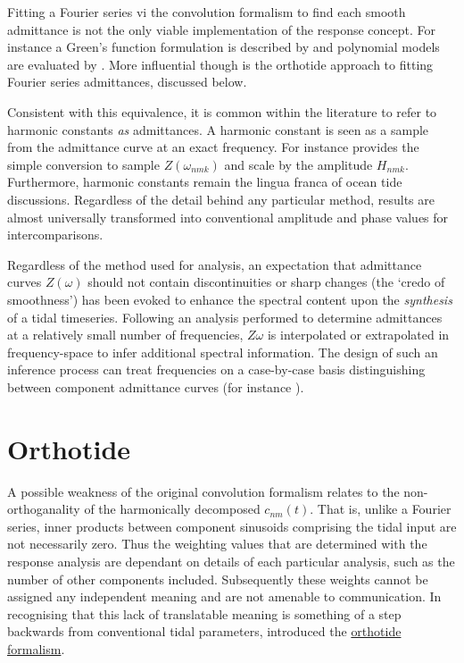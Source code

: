 Fitting a Fourier series vi the convolution formalism to find each smooth admittance is not the only viable implementation of the response concept.  For instance a Green's function formulation is described by \citet{Webb:1974ke} and polynomial models are evaluated by \citet{Desai:1995je}. More influential though is the orthotide approach to fitting Fourier series admittances, discussed below.


Consistent with this equivalence, it is common within the literature to refer to harmonic constants \emph{as} admittances.   A harmonic constant is seen as a sample from the admittance curve at an exact frequency. For instance \citet{Smith:1997ut} provides the simple conversion to sample $Z(\omega_{nmk})$ and scale by the \ATGP{} amplitude $H_{nmk}$.
Furthermore, harmonic constants remain the lingua franca of ocean tide discussions. Regardless of the detail behind any particular method, results are almost universally transformed into conventional amplitude and phase values for intercomparisons.


Regardless of the method used for analysis, an expectation that admittance curves $Z(\omega)$ should not contain discontinuities or sharp changes (the `credo of smoothness') has been evoked to enhance the spectral content upon the \emph{synthesis} of a tidal timeseries.  Following an analysis performed to determine admittances at a relatively small number of frequencies, $Z{\omega}$ is interpolated or extrapolated in frequency-space to infer additional spectral information.   The design of such an inference process can treat frequencies on a case-by-case basis distinguishing between component admittance curves (for instance \citet[pp 268]{Fu:2001ub}).

\section{Orthotide}%
A possible weakness of the original convolution formalism relates to the non-orthoganality of the harmonically decomposed $c_{nm}(t)$.  That is, unlike a Fourier series, inner products between component sinusoids comprising the tidal input are not necessarily zero.   Thus the weighting values that are determined with the response analysis are dependant on details of each particular analysis, such as the number of other components included.  Subsequently these weights cannot be assigned any independent meaning and are not amenable to communication.  
In recognising that this lack of translatable meaning is something of a step backwards from conventional tidal parameters, \citet{Groves:1975ky} introduced the \underline{orthotide formalism}.

